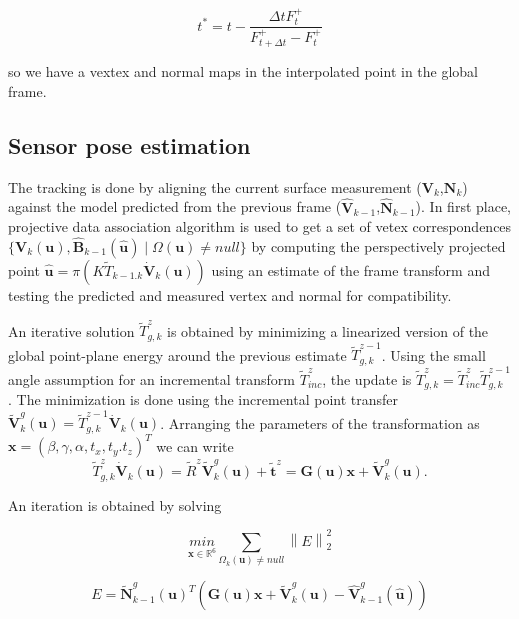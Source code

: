 \begin{equation}
t^* = t - \frac{\Delta t F^+_t}{F^+_{t+\Delta t} - F^+_t}
\end{equation}

so we have a vextex and normal maps in the interpolated point in the global frame.

\subsection{Sensor pose estimation}

The tracking is done by aligning the current surface measurement ($\mathbf{V}_k$,$\mathbf{N}_k$) against the model predicted from the previous frame ($\hat{\mathbf{V}}_{k-1}$,$\hat{\mathbf{N}}_{k-1}$).
In first place, projective data association algorithm is used to get a set of vetex correspondences $\{ \mathbf{V}_k(\mathbf{u}), \hat{\mathbf{B}}_{k-1}(\hat{\mathbf{u}}) \mid \Omega(\mathbf{u}) \neq null \}$ by computing the perspectively projected point $\hat{\mathbf{u}} = \pi(K \tilde{T}_{k-1.k} \dot{\mathbf{V}}_k(\mathbf{u}))$ using an estimate of the frame transform and testing the predicted and measured vertex and normal for compatibility.

An iterative solution $\tilde{T}^z_{g,k}$ is obtained by minimizing a linearized version of the global point-plane energy around the previous estimate $\tilde{T}^{z-1}_{g,k}$. Using the small angle assumption for an incremental transform $\tilde{T}^z_{inc}$, the update is $\tilde{T}^z_{g,k} = \tilde{T}^z_{inc}\tilde{T}^{z-1}_{g,k}$.
The minimization is done using the incremental point transfer $\tilde{\mathbf{V}}^g_k(\mathbf{u}) = \tilde{T}^{z-1}_{g,k} \dot{\mathbf{V}}_k(\mathbf{u})$. 
Arranging the parameters of the transformation as $ \mathbf{x} = (\beta,\gamma,\alpha,t_x,t_y.t_z)^T$ we can write
\begin{equation}
\tilde{T}^z_{g,k} \dot{\mathbf{V}}_k(\mathbf{u}) = \tilde{R}^z \tilde{\mathbf{V}}^g_k(\mathbf{u}) + \tilde{\mathbf{t}}^z = \mathbf{G}(\mathbf{u})\mathbf{x} + \tilde{\mathbf{V}}^g_k(\mathbf{u}).
\end{equation}

An iteration is obtained by solving

\begin{equation}
\underset{\mathbf{x} \in  \mathbb{R}^6 }{min} \sum_{\Omega_k (\mathbf{u}) \neq null} \left \| E \right \|^2_2
\end{equation}

\begin{equation}
 E = \tilde{\mathbf{N}}^g_{k-1}(\mathbf{u})^T \left( \mathbf{G}(\mathbf{u})\mathbf{x} + \tilde{\mathbf{V}}^g_k(\mathbf{u}) - \hat{\mathbf{V}}^g_{k-1}(\hat{\mathbf{u}}) \right)
\end{equation}

